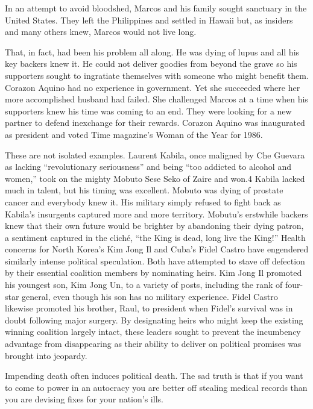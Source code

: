 \documentclass[10pt]{article}
\begin{document}
{\large In an attempt to avoid bloodshed, Marcos and his family sought sanctuary
in the United States. They left the Philippines and settled in Hawaii but, as
insiders and many others knew, Marcos would not live long.}

{\large That, in fact, had been his problem all along. He was dying of lupus and
all his key backers knew it. He could not deliver goodies from beyond the grave
so his supporters sought to ingratiate themselves with someone who might benefit
them. Corazon Aquino had no experience in government. Yet she succeeded where her
more accomplished husband had failed. She challenged Marcos at a time when his
supporters knew his time was coming to an end. They were looking for a new
partner to defend inexchange for their rewards. Corazon Aquino was inaugurated as
president and voted Time magazine's Woman of the Year for 1986.}

{\large These are not isolated examples. Laurent Kabila, once maligned by Che
Guevara as lacking ``revolutionary seriousness'' and being ``too addicted to
alcohol and women,'' took on the mighty Mobuto Sese Seko of Zaire and won.4
Kabila lacked much in talent, but his timing was excellent. Mobuto was dying of
prostate cancer and everybody knew it. His military simply refused to fight back
as Kabila's insurgents captured more and more territory. Mobutu's erstwhile
backers knew that their own future would be brighter by abandoning their dying
patron, a sentiment captured in the clich\'{e}, ``the King is dead, long live the
King!'' Health concerns for North Korea's Kim Jong Il and Cuba's Fidel Castro
have engendered similarly intense political speculation. Both have attempted to
stave off defection by their essential coalition members by nominating heirs. Kim
Jong Il promoted his youngest son, Kim Jong Un, to a variety of posts, including
the rank of four-star general, even though his son has no military experience.
Fidel Castro likewise promoted his brother, Raul, to president when Fidel's
survival was in doubt following major surgery. By designating heirs who might
keep the existing winning coalition largely intact, these leaders sought to
prevent the incumbency advantage from disappearing as their ability to deliver on
political promises was brought into jeopardy.}

{\large Impending death often induces political death. The sad truth is that if
you want to come to power in an autocracy you are better off stealing medical
records than you are devising fixes for your nation's ills.}
\end{document}
